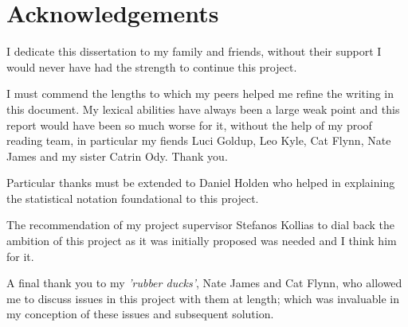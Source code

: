\documentclass[hidelinks,journal]{IEEEtran}
\begin{document}
\setlength{}
\printbibliography

\section*{Acknowledgements}
I dedicate this dissertation to my family and friends, without their support I would never have had the strength to continue this project.

I must commend the lengths to which my peers helped me refine the writing in this document. My lexical abilities have always been a large weak point and this report would have been so much worse for it, without the help of my proof reading team, in particular my fiends Luci Goldup, Leo Kyle, Cat Flynn, Nate James and my sister Catrin Ody. Thank you.

Particular thanks must be extended to Daniel Holden who helped in explaining the statistical notation foundational to this project.

The recommendation of my project supervisor Stefanos Kollias to dial back the ambition of this project as it was initially proposed was needed and I think him for it.

A final thank you to my \emph{'rubber ducks'}, Nate James and Cat Flynn, who allowed me to discuss issues in this project with them at length; which was invaluable in my conception of these issues and subsequent solution.
\end{document}
